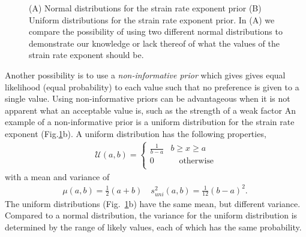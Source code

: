 \documentclass[12pt]{article}
\begin{document}
{\begin{figure}[H]
{}

\caption{(A) Normal distributions for the strain rate exponent prior (B) Uniform distributions for the strain rate exponent prior. In (A) we compare the possibility of using two different normal distributions to demonstrate our knowledge or lack thereof of what the values of the strain rate exponent should be. }
\label{fig:prior_ex} 
\end{figure}

Another possibility is to use a \textit{non-informative prior} \citep{Tarantola05} which gives gives equal likelihood (equal probability) to each value such that no preference is given to a single value. Using non-informative priors can be advantageous when it is not apparent what an acceptable value is, such as the strength of a weak factor An example of a non-informative prior is a uniform distribution for the strain rate exponent (Fig.\ref{fig:prior_ex}b). A uniform distribution has the following properties,
 \begin{align}
\mathcal{U}(a,b) =
\begin{cases}
 \frac{1}{b-a}   &b\geq x \geq a \\
               0 &\quad \text{otherwise} \\
\end{cases}
\end{align}
with a mean and variance of 
\begin{align}
\mu(a,b) =\frac{1}{2}(a+b) \quad s_{uni}^2(a,b) =\frac{1}{12}(b-a)^2 .\
\end{align}
The uniform distributions (Fig.~\ref{fig:prior_ex}b) have the same mean, but different variance. Compared to a normal distribution, the variance for the uniform distribution is determined by the range of likely values, each of which has the same probability.
	
}
\end{document}
